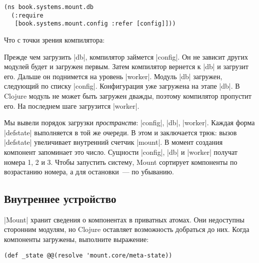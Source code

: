 \begin{verbatim}
(ns book.systems.mount.db
  (:require
   [book.systems.mount.config :refer [config]]))
\end{verbatim}

Что с точки зрения компилятора:


\vspace{1em}


\vspace{1em}

Прежде чем загрузить \spverb|db|, компилятор займется \spverb|config|. Он не
зависит других модулей будет и загружен первым. Затем компилятор вернется к
\spverb|db| и загрузит его. Дальше он поднимется на уровень
\spverb|worker|. Модуль \spverb|db| загружен, следующий по списку
\spverb|config|. Конфигурация уже загружена на этапе \spverb|db|. В Clojure
модуль не может быть загружен дважды, поэтому компилятор пропустит его. На
последнем шаге загрузится \spverb|worker|.

Мы вывели порядок загрузки \emph{пространств}: \spverb|config|, \spverb|db|,
\spverb|worker|. Каждая форма \spverb|defstate| выполняется в той же очереди. В
этом и заключается трюк: вызов \spverb|defstate| увеличивает внутренний счетчик
\spverb|mount|. В момент создания компонент запоминает это число. Сущности
\spverb|config|, \spverb|db| и \spverb|worker| получат номера 1, 2 и 3. Чтобы
запустить систему, Mount сортирует компоненты по возрастанию номера, а для
остановки~--- по убыванию.

\subsection{Внутреннее устройство}

\spverb|Mount| хранит сведения о компонентах в приватных атомах. Они недоступны
сторонним модулям, но Clojure оставляет возможность добраться до них. Когда
компоненты загружены, выполните выражение:

\begin{verbatim}
(def _state @@(resolve 'mount.core/meta-state))
\end{verbatim}

